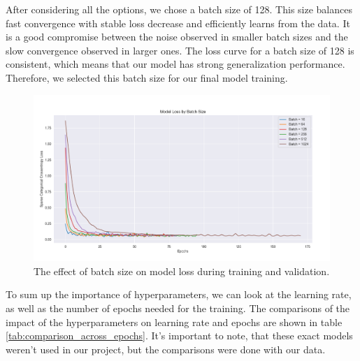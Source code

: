 After considering all the options, we chose a batch size of 128. This size balances fast convergence with stable loss decrease and efficiently learns from the data. It is a good compromise between the noise observed in smaller batch sizes and the slow convergence observed in larger ones. The loss curve for a batch size of 128 is consistent, which means that our model has strong generalization performance. Therefore, we selected this batch size for our final model training.

\begin{figure}[h]
	\centering
	\includegraphics[width=\textwidth]{images/batch_sizes_comparison.png}
	\caption{The effect of batch size on model loss during training and validation.}
	\label{fig:batch_sizes}
\end{figure}

To sum up the importance of hyperparameters, we can look at the learning rate, as well as the number of epochs needed for the training. The comparisons of the impact of the hyperparameters on learning rate and epochs are shown in table \ref{tab:comparison_across_epochs}. It's important to note, that these exact models weren't used in our project, but the comparisons were done with our data.


